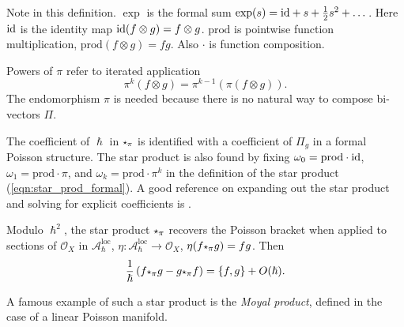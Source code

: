     
    
    
    \begin{rem}
    Note in this definition.  \( \exp \) is the formal sum \( \exp(s) = \mathrm{id} + s + \frac{1}{2} s^2 + \dots\). Here \(  \mathrm{id} \) is the identity map \( \mathrm{id} (f \otimes g) = f \otimes g\). \( \mathrm{prod}\) is pointwise function multiplication, \( \mathrm{prod}(f \otimes g ) = f g\). Also \( \cdot\) is function composition. 
    
    Powers of \( \pi \) refer to iterated application \[ \pi^k ( f \otimes g ) = \pi^{k-1} ( \pi(f \otimes g ) ). \]  
    The endomorphism \( \pi \) is needed because there is no natural way to compose bi-vectors \( \Pi\).
    \end{rem} 

    
    The coefficient of \( \hslash\) in \( \starp_{\pi}\) is identified with a coefficient of \( \Pi_g\) in a formal Poisson structure. The star product is also found by fixing \( \omega_0 = \mathrm{prod} \cdot 
    \mathrm{id} \), \( \omega_1 = \mathrm{prod} \cdot \pi\), and  \( \omega_k = \mathrm{prod} \cdot \pi^k \) in the definition of the star product (\ref{eqn:star_prod_formal}). A good reference on expanding out the star product and solving for explicit coefficients is \cite{starprodeasy}.
    
    Modulo \(\hslash^2\), the star product \( \starp_{\pi}\) recovers the Poisson bracket when applied to sections of \( \mathcal{O}_X\) in \( \mathcal{A}^{\text{loc}}_{\hslash}\),  \( \eta : \mathcal{A}^{\text{loc}}_\hslash \rightarrow \mathcal{O}_X\),
    \( \eta ( f \starp_{\pi} g )= f g \). Then
    \begin{align}
        \label{eqn:star_to_pois}
        \frac{1}{\hslash } \left( f \starp_{\pi} g - g \starp_{\pi} f \right) = \{f,g\} + O(\hslash).
    \end{align}    
    \iffalse
    
    \fi 
    A famous example of such a star product is the \emph{Moyal product}, defined in the case of a linear Poisson manifold.
    
